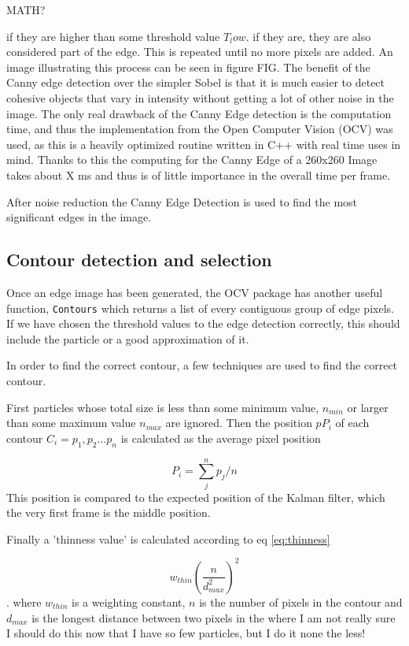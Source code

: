 MATH?

 if they are higher than some threshold value $T_low$. if they are, they are also considered part of the edge. This is repeated until no more pixels are added. An image illustrating this process can be seen in figure FIG. The benefit of the Canny edge detection over the simpler Sobel is that it is much easier to detect cohesive objects that vary in intensity without getting a lot of other noise in the image. The only real drawback of the Canny Edge detection is the computation time, and thus the implementation from the Open Computer Vision (OCV) was used, as this is a heavily optimized routine written in C++ with real time uses in mind. Thanks to this the computing for the Canny Edge of a 260x260 Image takes about X ms and thus is of little importance in the overall time per frame.

After noise reduction the Canny Edge Detection is used to find the most significant edges in the image. 

\subsection{Contour detection and selection}

Once an edge image has been generated, the OCV package has another useful function, \texttt{Contours} which returns a list of every contiguous group of edge pixels. If we have chosen the threshold values to the edge detection correctly, this should include the particle or a good approximation of it. 

In order to find the correct contour, a few techniques are used to find the correct contour.

First particles whose total size is less than some minimum value, $ n_{min}$ or larger than some maximum value $n_{max}$ are ignored. Then the position $pP_i$ of each contour $C_i={p_1,p_2...p_n}$ is calculated as the average pixel position

\[
P_i = \sum_{j}^n p_j/n
\]
This position is compared to the expected position of the Kalman filter, which the very first frame is the middle position. 

Finally a 'thinness value' is calculated according to eq \ref{eq:thinness}

\begin{equation}\label{eq:thinness}
w_{thin}\left(\frac{ n}{d_{max}^2}\right)^2
\end{equation}. 
where $w_{thin}$ is a weighting constant, $n$ is the number of pixels in the contour and $d_{max}$ is the longest distance between two pixels in the 
where I am not really sure I should do this now that I have so few particles, but I do it none the less!

